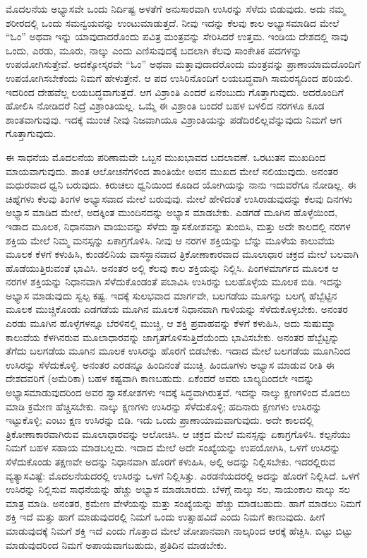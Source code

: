 ಮೊದಲನೆಯ ಅಭ್ಯಾಸವೇ ಒಂದು ನಿರ್ದಿಷ್ಟ ಅಳತೆಗೆ ಅನುಸಾರವಾಗಿ ಉಸಿರನ್ನು ಸೆಳೆದು ಬಿಡುವುದು. ಅದು ನಮ್ಮ ಶರೀರದಲ್ಲಿ ಒಂದು ಸಮನ್ವಯವನ್ನು ಉಂಟುಮಾಡುತ್ತದೆ. ನೀವು ಇದನ್ನು ಕೆಲವು ಕಾಲ ಅಭ್ಯಾಸಮಾಡಿದ ಮೇಲೆ “ಓಂ” ಅಥವಾ ಇನ್ನು ಯಾವುದಾದರೊಂದು ಪವಿತ್ರ ಮಂತ್ರವನ್ನು ಸೇರಿಸಿದರೆ ಉತ್ತಮ. ಇಂಡಿಯ ದೇಶದಲ್ಲಿ ನಾವು ಒಂದು, ಎರಡು, ಮೂರು, ನಾಲ್ಕು ಎಂದು ಎಣಿಸುವುದಕ್ಕೆ ಬದಲಾಗಿ ಕೆಲವು ಸಾಂಕೇತಿಕ ಪದಗಳನ್ನು ಉಪಯೋಗಿಸುತ್ತೇವೆ. ಅದಕ್ಕೋಸ್ಕರವೇ “ಓಂ” ಅಥವಾ ಮತ್ತಾವುದಾದರೊಂದು ಮಂತ್ರವನ್ನು ಪ್ರಾಣಾಯಾಮದೊಂದಿಗೆ ಉಪಯೋಗಿಸಬೇಕೆಂದು ನಿಮಗೆ ಹೇಳುತ್ತೇನೆ. ಆ ಪದ ಉಸಿರಿನೊಂದಿಗೆ ಲಯಬದ್ಧವಾಗಿ ಸಾಮರಸ್ಯದಿಂದ ಹರಿಯಲಿ. ಇದರಿಂದ ದೇಹವೆಲ್ಲ ಲಯಬದ್ಧವಾಗುತ್ತದೆ. ಆಗ ವಿಶ್ರಾಂತಿ ಎಂದರೆ ಏನೆಂಬುದು ಗೊತ್ತಾಗುವುದು. ಅದರೊಂದಿಗೆ ಹೋಲಿಸಿ ನೋಡಿದರೆ ನಿದ್ರೆ ವಿಶ್ರಾಂತಿಯಲ್ಲ. ಒಮ್ಮೆ ಈ ವಿಶ್ರಾಂತಿ ಬಂದರೆ ಬಹಳ ಬಳಲಿದ ನರಗಳೂ ಕೂಡ ಶಾಂತವಾಗುವುವು. ಇದಕ್ಕೆ ಮುಂಚೆ ನೀವು ನಿಜವಾಗಿಯೂ ವಿಶ್ರಾಂತಿಯನ್ನು ಪಡೆದಿರಲಿಲ್ಲವೆನ್ನುವುದು ನಿಮಗೆ ಆಗ ಗೊತ್ತಾಗುವುದು. 

ಈ ಸಾಧನೆಯ ಮೊದಲನೆಯ ಪರಿಣಾಮವೇ ಒಬ್ಬನ ಮುಖಭಾವದ ಬದಲಾವಣೆ. ಒರಟುತನ ಮುಖದಿಂದ ಮಾಯವಾಗುವುದು. ಶಾಂತ ಆಲೋಚನೆಗಳಿಂದ ಶಾಂತಿಯೇ ಅವನ ಮುಖದ ಮೇಲೆ ನಲಿಯುವುದು. ಅನಂತರ ಮಧುರವಾದ ಧ್ವನಿ ಬರುವುದು. ಕಿರುಚಲು ಧ್ವನಿಯಿಂದ ಕೂಡಿದ ಯೋಗಿಯನ್ನು ನಾನು ಇದುವರೆಗೂ ನೋಡಿಲ್ಲ. ಈ ಚಿಹ್ನೆಗಳು ಕೆಲವು ತಿಂಗಳ ಅಭ್ಯಾಸವಾದ ಮೇಲೆ ಬರುವುವು. ಮೇಲೆ ಹೇಳಿದಂತೆ ಉಸಿರಾಡುವುದನ್ನು ಕೆಲವು ದಿನಗಳು ಅಭ್ಯಾಸ ಮಾಡಿದ ಮೇಲೆ, ಅದಕ್ಕಿಂತ ಮುಂದಿನದನ್ನು ಅಭ್ಯಾಸ ಮಾಡಬೇಕು. ಎಡಗಡೆ ಮೂಗಿನ ಹೊಳ್ಳೆಯಿಂದ, ಇಡಾದ ಮೂಲಕ, ನಿಧಾನವಾಗಿ ವಾಯುವನ್ನು ಸೆಳೆದು ಶ್ವಾಸಕೋಶವನ್ನು ತುಂಬಿಸಿ, ಮತ್ತು ಅದೇ ಕಾಲದಲ್ಲಿ ನರಗಳ ಶಕ್ತಿಯ ಮೇಲೆ ನಿಮ್ಮ ಮನಸ್ಸನ್ನು ಏಕಾಗ್ರಗೊಳಿಸಿ. ನೀವು ಆ ನರಗಳ ಶಕ್ತಿಯನ್ನು ಬೆನ್ನು ಮೂಳೆಯ ಕಾಲುವೆಯ ಮೂಲಕ ಕೆಳಗೆ ಕಳುಹಿಸಿ, ಕುಂಡಲಿನಿಯ ವಾಸಸ್ಥಾನವಾದ ತ್ರಿಕೋಣಾಕಾರವಾದ ಮೂಲಾಧಾರ ಚಕ್ರದ ಮೇಲೆ ಬಲವಾಗಿ ಹೊಡೆಯುತ್ತಿರುವಂತೆ ಭಾವಿಸಿ. ಅನಂತರ ಅಲ್ಲಿ ಕೆಲವು ಕಾಲ ಶಕ್ತಿಯನ್ನು ನಿಲ್ಲಿಸಿ. ಪಿಂಗಳಮಾರ್ಗದ ಮೂಲಕ ಆ ನರಗಳ ಶಕ್ತಿಯನ್ನು ನಿಧಾನವಾಗಿ ಸೆಳೆದುಕೊಂಡಂತೆ ಪಬಾವಿಸಿ ಉಸಿರನ್ನು ಬಲಹೊಳ್ಳೆಯ ಮೂಲಕ ಬಿಡಿ. ಇದನ್ನು ಅಭ್ಯಾಸ ಮಾಡುವುದು ಸ್ವಲ್ಪ ಕಷ್ಟ. ಇದಕ್ಕೆ ಸುಲಭವಾದ ಮಾರ್ಗವೇ, ಬಲಗಡೆಯ ಮೂಗನ್ನು ಬಲಗೈ ಹೆಬ್ಬೆಟ್ಟಿನ ಮೂಲಕ ಮುಚ್ಚಿಕೊಂಡು ಎಡಗಡೆಯ ಮೂಗಿನ ಮೂಲಕ ನಿಧಾನವಾಗಿ ಗಾಳಿಯನ್ನು ಸೆಳೆದುಕೊಳ್ಳಬೇಕು. ಅನಂತರ ಎರಡು ಮೂಗಿನ ಹೊಳ್ಳೆಗಳನ್ನೂ ಬೆರಳಿನಲ್ಲಿ ಮುಚ್ಚಿ, ಆ ಶಕ್ತಿ ಪ್ರವಾಹವನ್ನು ಕೆಳಗೆ ಕಳುಹಿಸಿ, ಅದು ಸುಷುಮ್ನಾ ಕಾಲುವೆಯ ಕೆಳಗಿನರುವ ಮೂಲಾಧಾರವನ್ನು ಜಾಗೃತಗೊಳಿಸುತ್ತಿದೆಯೆಂದು ಭಾವಿಸಬೇಕು. ಅನಂತರ ಹೆಬ್ಬೆಟ್ಟನ್ನು ತೆಗೆದು ಬಲಗಡೆಯ ಮೂಗಿನ ಮೂಲಕ ಉಸಿರನ್ನು ಹೊರಗೆ ಬಿಡಬೇಕು. ಇದಾದ ಮೇಲೆ ಬಲಗಡೆಯ ಮೂಗಿನಿಂದ ಉಸಿರನ್ನು ಸೆಳೆದುಕೊಳ್ಳಿ. ಅನಂತರ ಎರಡನ್ನೂ ಹಿಂದಿನಂತೆ ಮುಚ್ಚಿ. ಹಿಂದೂಗಳು ಅಭ್ಯಾಸ ಮಾಡುವ ರೀತಿ ಈ ದೇಶದವರಿಗೆ (ಅಮೆರಿಕಾ) ಬಹಳ ಕಷ್ಟವಾಗಿ ಕಾಣಬಹುದು. ಏಕೆಂದರೆ ಅವರು ಬಾಲ್ಯದಿಂದಲೇ ಇದನ್ನು ಅಭ್ಯಾಸಮಾಡುವುದರಿಂದ ಅವರ ಶ್ವಾಸಕೋಶಗಳು ಇದಕ್ಕೆ ಸಿದ್ಧವಾಗಿರುತ್ತವೆ. ಇದನ್ನು ನಾಲ್ಕು ಕ್ಷಣಗಳಿಂದ ಮೊದಲು ಮಾಡಿ ಕ್ರಮೇಣ ಹೆಚ್ಚಿಸಬೇಕು. ನಾಲ್ಕು ಕ್ಷಣಗಳು ಉಸಿರನ್ನು ಸೆಳೆದುಕೊಳ್ಳಿ; ಹದಿನಾರು ಕ್ಷಣಗಳು ಉಸಿರನ್ನು ಇಟ್ಟುಕೊಳ್ಳಿ; ಎಂಟು ಕ್ಷಣ ಉಸಿರನ್ನು ಬಿಡಿ. ಇದು ಒಂದು ಪ್ರಾಣಾಯಾಮವಾಗುವುದು. ಅದೇ ಕಾಲದಲ್ಲಿ ತ್ರಿಕೋಣಾಕಾರವಾಗಿರುವ ಮೂಲಾಧಾರವನ್ನು ಆಲೋಚಿಸಿ. ಆ ಚಕ್ರದ ಮೇಲೆ ಮನಸ್ಸನ್ನು ಏಕಾಗ್ರಗೊಳಿಸಿ. ಕಲ್ಪನೆಯು ನಿಮಗೆ ಬಹಳ ಸಹಾಯ ಮಾಡಬಲ್ಲದು. ಇದಾದ ಮೇಲೆ ಅದೇ ಸಂಖ್ಯೆಯನ್ನು ಉಪಯೋಗಿಸಿ, ಒಳಗೆ ಉಸಿರನ್ನು ಸೆಳೆದುಕೊಂಡು ತಕ್ಷಣವೇ ಅದನ್ನು ನಿಧಾನವಾಗಿ ಹೊರಗೆ ಕಳುಹಿಸಿ, ಅಲ್ಲಿ ಅದನ್ನು ನಿಲ್ಲಿಸಬೇಕು. ಇದರಲ್ಲಿರುವ ವ್ಯತ್ಯಾಸವಿಷ್ಟೆ: ಮೊದಲನೆಯದರಲ್ಲಿ ಉಸಿರನ್ನು ಒಳಗೆ ನಿಲ್ಲಿಸಿತ್ತು. ಎರಡನೆಯದರಲ್ಲಿ ಅದನ್ನು ಹೊರಗೆ ನಿಲ್ಲಿಸಿದೆ. ಒಳಗೆ ಉಸಿರನ್ನು ನಿಲ್ಲಿಸುವ ಸಾಧನೆಯನ್ನು ಹೆಚ್ಚು ಅಭ್ಯಾಸ ಮಾಡಬಾರದು. ಬೆಳಗ್ಗೆ ನಾಲ್ಕು ಸಲ, ಸಾಯಂಕಾಲ ನಾಲ್ಕು ಸಲ ಮಾತ್ರ ಮಾಡಿ. ಅನಂತರ, ಕ್ರಮೇಣ ವೇಳೆಯನ್ನು ಮತ್ತು ಸಂಖ್ಯೆಯನ್ನು ಹೆಚ್ಚು ಮಾಡಬಹುದು. ಹಾಗೆ ಮಾಡಲು ನಿಮಗೆ ಶಕ್ತಿ ಇದೆ ಮತ್ತು ಹಾಗೆ ಮಾಡುವುದರಲ್ಲಿ ನಿಮಗೆ ಒಂದು ಉತ್ಸಾಹವಿದೆ ಎಂದು ನಿಮಗೆ ಕಾಣುವುದು. ಹೀಗೆ ಮಾಡುವುದಕ್ಕೆ ನಿಮಗೆ ಶಕ್ತಿ ಇದೆ ಎಂದು ಗೊತ್ತಾದ ಮೇಲೆ ಜೋಪಾನವಾಗಿ ನಾಲ್ಕರಿಂದ ಆರಕ್ಕೆ ಹೆಚ್ಚಿಸಿ. ಬಿಟ್ಟು ಬಿಟ್ಟು ಮಾಡುವುದರಿಂದ ನಿಮಗೆ ಅಪಾಯವಾಗಬಹುದು, ಪ್ರತಿದಿನ ಮಾಡಬೇಕು. 

